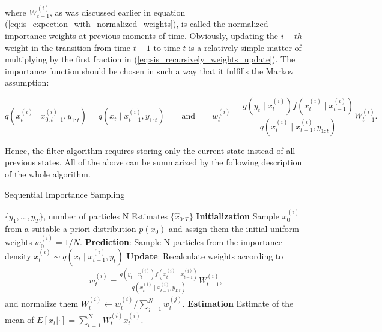 \noindent where \(W_{t-1}^{(i)}\), as was discussed earlier in equation (\ref{eq:is_expection_with_normalized_weights}), is called the normalized importance weights at previous moments of time. Obviously, updating the \(i-th\) weight in the transition from time \(t-1\) to time \(t\) is a relatively simple matter of multiplying by the first fraction in (\ref{eq:sis_recursively_weights_update}). The importance function should be chosen in such a way that it fulfills the Markov assumption:

\begin{equation}
    q\left(x_t^{(i)} \mid x_{0: t-1}^{(i)}, y_{1: t}\right) = q\left(x_t \mid x_{t-1}^{(i)}, y_{1: t}\right) \qquad\text{and}\qquad w_t^{(i)}= \frac{g\left(y_t \mid x_t^{(i)}\right) f\left(x_t^{(i)} \mid x_{t-1}^{(i)}\right)}{q\left(x_t^{(i)} \mid x_{t-1}^{(i)}, y_{1: t}\right)} W_{t-1}^{(i)}.
\end{equation}

Hence, the filter algorithm requires storing only the current state instead of all previous states. All of the above can be summarized by the following description of the whole algorithm.

\begin{algorithm}
    \caption{Sequential Importance Sampling}
  \begin{algorithmic}[1]
    \INPUT \(\{y_1, . . . , y_T\}\), number of particles N
    \OUTPUT Estimates \(\{\hat{x}_{0:T}\}\)
    \STATE \textbf{Initialization} Sample \(x_0^{(i)}\) from a suitable a priori distribution \(p(x_0)\) and assign them the initial uniform weights \(w_0^{(i)} = 1/N\).
      \STATE \textbf{Prediction}: Sample N particles from the importance density \(x_t^{(i)} \sim q\left(x_t \mid x_{t-1}^{(i)}, y_t\right)\)
      \STATE \textbf{Update}: Recalculate weights according to
        $$
        \begin{aligned}
w_t^{(i)}= \frac{g\left(y_t \mid x_t^{(i)}\right) f\left(x_t^{(i)} \mid x_{t-1}^{(i)}\right)}{q\left(x_t^{(i)} \mid x_{t-1}^{(i)}, y_{1: t}\right)} W_{t-1}^{(i)},
        \end{aligned}
        $$
        and normalize them \(W_t^{(i)} \leftarrow w_t^{(i)}/\sum_{j=1}^N w_t^{(j)}\).
    \STATE \textbf{Estimation} Estimate of the mean of \(E[x_t|\cdot] = \sum_{i=1}^{N}W_{t}^{(i)} x_t^{(i)}\).
    \ENDFOR
  \end{algorithmic}
  \label{alg:sis}
\end{algorithm}

